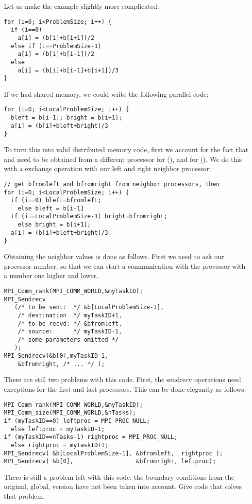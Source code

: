 Let us make the example slightly more complicated:
\begin{verbatim}
for (i=0; i<ProblemSize; i++) {
  if (i==0)
    a[i] = (b[i]+b[i+1])/2
  else if (i==ProblemSize-1)
    a[i] = (b[i]+b[i-1])/2
  else
    a[i] = (b[i]+b[i-1]+b[i+1])/3
}
\end{verbatim}
If we had shared memory, we could write the following parallel code:
\begin{verbatim}
for (i=0; i<LocalProblemSize; i++) {
  bleft = b[i-1]; bright = b[i+1];
  a[i] = (b[i]+bleft+bright)/3
}
\end{verbatim}
To turn this into valid distributed memory code,
first we account for the fact that  and  need to be
obtained from a different processor for  (), and for
 (). We do this with a exchange
operation with our left and right neighbor processor:
\begin{verbatim}
// get bfromleft and bfromright from neighbor processors, then
for (i=0; i<LocalProblemSize; i++) {
  if (i==0) bleft=bfromleft;
    else bleft = b[i-1]
  if (i==LocalProblemSize-1) bright=bfromright;
    else bright = b[i+1];
  a[i] = (b[i]+bleft+bright)/3
}
\end{verbatim}
Obtaining the neighbor values is done as follows. First we need to
ask our processor number, so that we can start a communication with
the processor with a number one higher and lower.
\begin{verbatim}
MPI_Comm_rank(MPI_COMM_WORLD,&myTaskID);
MPI_Sendrecv
   (/* to be sent:  */ &b[LocalProblemSize-1],
    /* destination  */ myTaskID+1,
    /* to be recvd: */ &bfromleft,
    /* source:      */ myTaskID-1, 
    /* some parameters omitted */ 
   );
MPI_Sendrecv(&b[0],myTaskID-1,
    &bfromright, /* ... */ );
\end{verbatim}
There are still two problems with this code. First, the sendrecv
operations need exceptions for the first and last processors. This can
be done elegantly as follows:
\begin{verbatim}
MPI_Comm_rank(MPI_COMM_WORLD,&myTaskID);
MPI_Comm_size(MPI_COMM_WORLD,&nTasks);
if (myTaskID==0) leftproc = MPI_PROC_NULL;
  else leftproc = myTaskID-1;
if (myTaskID==nTasks-1) rightproc = MPI_PROC_NULL;
  else rightproc = myTaskID+1;
MPI_Sendrecv( &b[LocalProblemSize-1], &bfromleft,  rightproc );
MPI_Sendrecv( &b[0],                  &bfromright, leftproc);
\end{verbatim}

\begin{exercise}
  There is still a problem left with this code: the boundary
  conditions from the original, global, version have not been taken
  into account. Give code that solves that problem.
\end{exercise}

